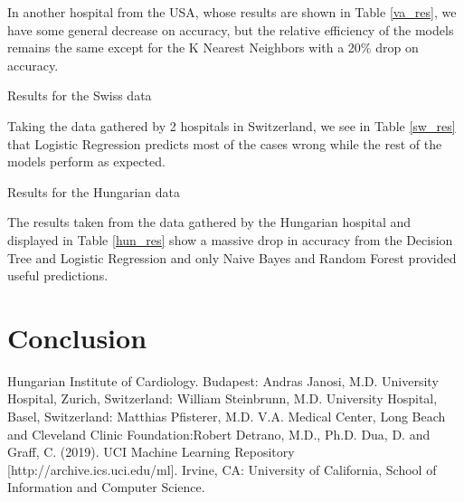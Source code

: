 \documentclass[conference]{IEEEtran}
\begin{document}
In another hospital from the USA\cite{va}, whose results are shown in Table \ref{va_res}, we have some general decrease on accuracy, but the relative efficiency of the models remains the same except for the K Nearest Neighbors with a 20\% drop on accuracy.

\begin{table}[htbp]
    \caption{Results for the Swiss data}
    \begin{center}
        
        \label{sw_res}
    \end{center}
\end{table}

Taking the data gathered by 2 hospitals in Switzerland\cite{swz1,swz2}, we see in Table \ref{sw_res} that Logistic Regression predicts most of the cases wrong while the rest of the models perform as expected.

\begin{table}[H]
    \caption{Results for the Hungarian data}
    \begin{center}
        
        \label{hun_res}
    \end{center}
\end{table}

The results taken from the data gathered by the Hungarian hospital\cite{hun} and displayed in Table \ref{hun_res} show a massive drop in accuracy from the Decision Tree and Logistic Regression and only Naive Bayes and Random Forest provided useful predictions.

\section{Conclusion}

\begin{thebibliography}{00}
     Hungarian Institute of Cardiology. Budapest: Andras Janosi, M.D.
     University Hospital, Zurich, Switzerland: William Steinbrunn, M.D.
     University Hospital, Basel, Switzerland: Matthias Pfisterer, M.D.
     V.A. Medical Center, Long Beach and Cleveland Clinic Foundation:Robert Detrano, M.D., Ph.D.
     Dua, D. and Graff, C. (2019). UCI Machine Learning Repository [http://archive.ics.uci.edu/ml]. Irvine, CA: University of California, School of Information and Computer Science.
\end{thebibliography}
\end{document}
